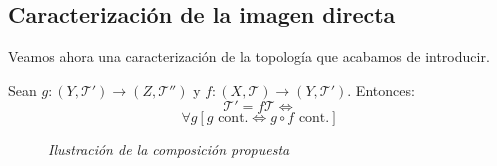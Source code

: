 \subsection{Caracterización de la imagen directa}
\label{sub:caracterizacion_de_la_imagen_directa}
Veamos ahora una caracterización de la topología que acabamos de introducir.
\begin{theo}
Sean $g: \left( Y, \mathcal{T}' \right) \rightarrow \left( Z, \mathcal{T}'' \right)$ y $f: \left( X, \mathcal{T} \right) \rightarrow \left( Y, \mathcal{T}' \right)$. Entonces:
    \[
    \mathcal{T}' = f\mathcal{T} \Leftrightarrow  
    \]
    \begin{equation}\label{eq:prop_universal_directa}
        \forall g \left[ g \text{ cont.} \Leftrightarrow g \circ f \text{ cont.} \right]
    \end{equation}

    \begin{figure}[H]
        \centering    
        \caption{\textit{Ilustración de la composición propuesta}}
        \label{prop_universal_directas}
    \end{figure}
\end{theo}
